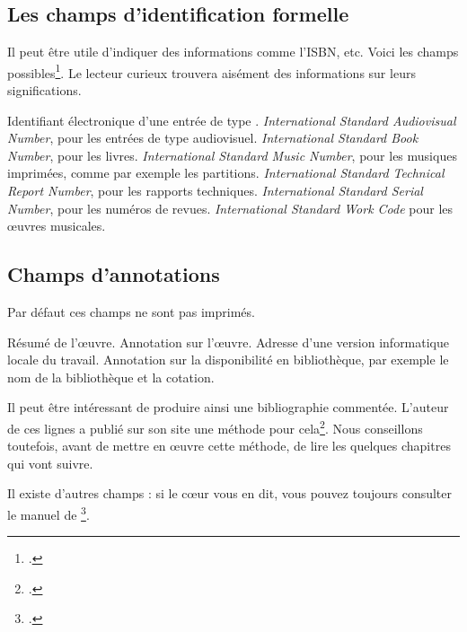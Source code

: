\subsection{Les champs d'identification formelle}

Il peut être utile d'indiquer des informations comme l'ISBN, etc. Voici les champs possibles\footcite[Par défaut,  imprime ces champs s'ils sont remplis. Il est toutefois possible de ne pas les afficher en passant l'option  au chargement du package, voir:][]{biblatex_isbn}.  Le lecteur curieux trouvera aisément des informations sur leurs significations.

\begin{fieldlist}
	 Identifiant électronique d'une entrée de type . 
   	 \emph{\textenglish{International Standard Audiovisual Number}}, pour les entrées de type audiovisuel.
   	 \emph{\textenglish{International Standard Book Number}}, pour les livres. 
   	 \emph{\textenglish{International Standard Music Number}}, pour les musiques imprimées, comme par exemple les partitions. 
   	 \emph{\textenglish{International Standard Technical Report Number}}, pour les rapports techniques. 
   	 \emph{\textenglish{International Standard Serial Number}}, pour les numéros de revues. 
   	 \emph{\textenglish{International Standard Work Code}} pour les œuvres musicales.
\end{fieldlist}

\subsection{Champs d'annotations}

Par défaut ces champs ne sont pas imprimés. 

\begin{fieldlist}
	 Résumé de l'œuvre. 
   	 Annotation sur l'œuvre.
   	 Adresse d'une version informatique locale du travail. 
   	 Annotation sur la disponibilité en bibliothèque, par exemple  le nom de la bibliothèque et la cotation.
	
\end{fieldlist}

\begin{plusloins}
Il peut être intéressant de produire ainsi une bibliographie commentée. L'auteur de ces lignes a publié sur son site une méthode pour cela\footcite{biblio_commentee}. Nous conseillons toutefois, avant de mettre en œuvre cette méthode, de lire les quelques chapitres qui vont suivre.
\end{plusloins}

Il existe d'autres champs : si le cœur vous en dit, vous pouvez toujours consulter le manuel de \footcite{biblatex_champs}.
